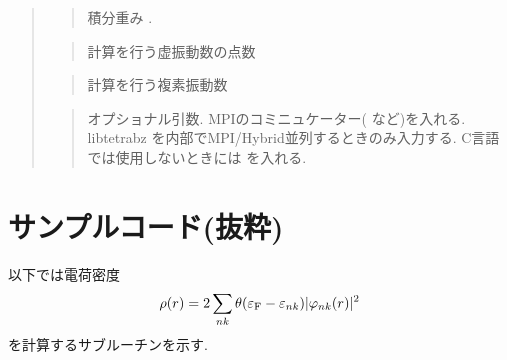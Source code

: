 \documentclass[letterpaper,10pt,dvipdfmx,openany]{sphinxmanual}
\begin{document}
\begin{quote}
\begin{quote}
\sphinxAtStartPar
積分重み .
\end{quote}

\begin{sphinxVerbatim}[commandchars=\\\{\}]
\end{sphinxVerbatim}
\begin{quote}

\sphinxAtStartPar
計算を行う虚振動数の点数
\end{quote}

\begin{sphinxVerbatim}[commandchars=\\\{\}]
\end{sphinxVerbatim}
\begin{quote}

\sphinxAtStartPar
計算を行う複素振動数
\end{quote}

\begin{sphinxVerbatim}[commandchars=\\\{\}]
\end{sphinxVerbatim}
\begin{quote}

\sphinxAtStartPar
オプショナル引数.
MPIのコミニュケーター(  など)を入れる.
libtetrabz を内部でMPI/Hybrid並列するときのみ入力する.
C言語では使用しないときには  を入れる.
\end{quote}
\end{quote}

\sphinxstepscope


\chapter{サンプルコード(抜粋)}
\label{\detokenize{sample:id1}}\label{\detokenize{sample::doc}}
\sphinxAtStartPar
以下では電荷密度
\begin{equation*}
\begin{split}\begin{align}
\rho(r) = 2 \sum_{n k} \theta(\varepsilon_{\rm F} - \varepsilon_{n k})
|\varphi_{n k}(r)|^2
\end{align}\end{split}
\end{equation*}
\sphinxAtStartPar
を計算するサブルーチンを示す.
\end{document}
